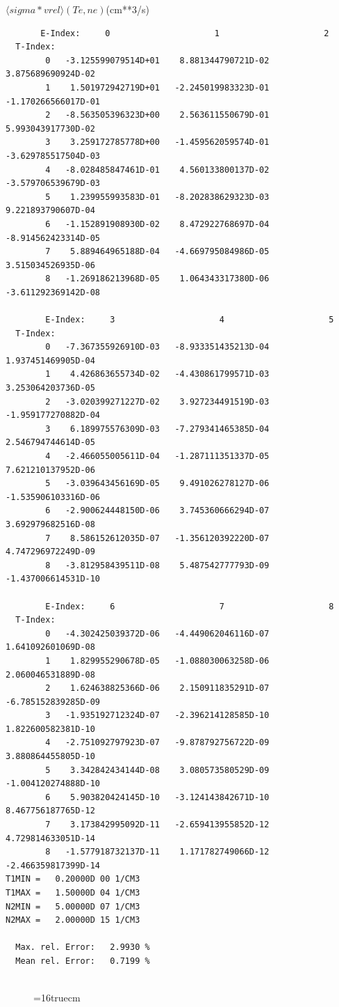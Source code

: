 \documentclass[12pt,dvipdfmx]{article}
\begin{document}
$  \langle sigma*vrel \rangle(Te,ne) $(cm**3/s)
\begin{small}\begin{verbatim}
       E-Index:     0                     1                     2
  T-Index:
        0   -3.125599079514D+01    8.881344790721D-02    3.875689690924D-02
        1    1.501972942719D+01   -2.245019983323D-01   -1.170266566017D-01
        2   -8.563505396323D+00    2.563611550679D-01    5.993043917730D-02
        3    3.259172785778D+00   -1.459562059574D-01   -3.629785517504D-03
        4   -8.028485847461D-01    4.560133800137D-02   -3.579706539679D-03
        5    1.239955993583D-01   -8.202838629323D-03    9.221893790607D-04
        6   -1.152891908930D-02    8.472922768697D-04   -8.914562423314D-05
        7    5.889464965188D-04   -4.669795084986D-05    3.515034526935D-06
        8   -1.269186213968D-05    1.064343317380D-06   -3.611292369142D-08

        E-Index:     3                     4                     5
  T-Index:
        0   -7.367355926910D-03   -8.933351435213D-04    1.937451469905D-04
        1    4.426863655734D-02   -4.430861799571D-03    3.253064203736D-05
        2   -3.020399271227D-02    3.927234491519D-03   -1.959177270882D-04
        3    6.189975576309D-03   -7.279341465385D-04    2.546794744614D-05
        4   -2.466055005611D-04   -1.287111351337D-05    7.621210137952D-06
        5   -3.039643456169D-05    9.491026278127D-06   -1.535906103316D-06
        6   -2.900624448150D-06    3.745360666294D-07    3.692979682516D-08
        7    8.586152612035D-07   -1.356120392220D-07    4.747296972249D-09
        8   -3.812958439511D-08    5.487542777793D-09   -1.437006614531D-10

        E-Index:     6                     7                     8
  T-Index:
        0   -4.302425039372D-06   -4.449062046116D-07    1.641092601069D-08
        1    1.829955290678D-05   -1.088030063258D-06    2.060046531889D-08
        2    1.624638825366D-06    2.150911835291D-07   -6.785152839285D-09
        3   -1.935192712324D-07   -2.396214128585D-10    1.822600582381D-10
        4   -2.751092797923D-07   -9.878792756722D-09    3.880864455805D-10
        5    3.342842434144D-08    3.080573580529D-09   -1.004120274888D-10
        6    5.903820424145D-10   -3.124143842671D-10    8.467756187765D-12
        7    3.173842995092D-11   -2.659413955852D-12    4.729814633051D-14
        8   -1.577918732137D-11    1.171782749066D-12   -2.466359817399D-14
T1MIN =   0.20000D 00 1/CM3
T1MAX =   1.50000D 04 1/CM3
N2MIN =   5.00000D 07 1/CM3
N2MAX =   2.00000D 15 1/CM3

  Max. rel. Error:   2.9930 %
  Mean rel. Error:   0.7199 %


\end{verbatim}\end{small}
\begin{figure} \label{2.7A0}
\epsfxsize=16truecm 
\end{figure}
\newpage
\end{document}

